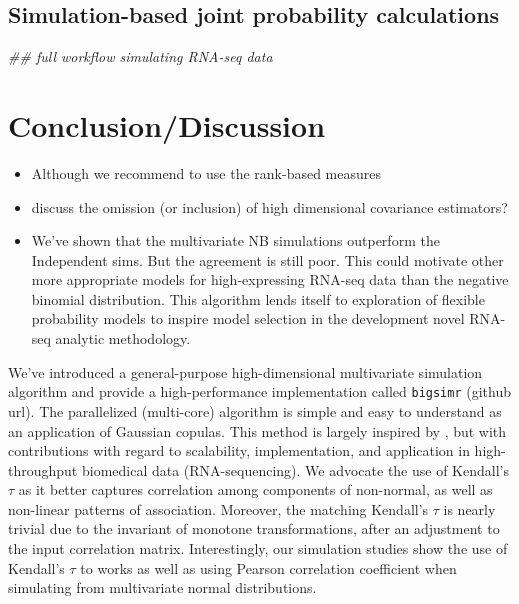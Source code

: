 \documentclass[
]{article}
\newenvironment{Shaded}{\begin{snugshade}}{\end{snugshade}}
\newcommand{\CommentTok}[1]{\textcolor[rgb]{0.56,0.35,0.01}{\textit{#1}}}
\providecommand{\tightlist}{%
  \setlength{\itemsep}{0pt}\setlength{\parskip}{0pt}}
\begin{document}
\hypertarget{simulation-based-joint-probability-calculations}{%
\subsection{Simulation-based joint probability calculations}\label{simulation-based-joint-probability-calculations}}

\begin{Shaded}
\begin{Highlighting}[]
\CommentTok{\#\# full workflow simulating RNA{-}seq data}
\end{Highlighting}
\end{Shaded}

\hypertarget{conclusiondiscussion}{%
\section{Conclusion/Discussion}\label{conclusiondiscussion}}

\begin{itemize}
\tightlist
\item
  Although we recommend to use the rank-based measures
\item
  discuss the omission (or inclusion) of high dimensional covariance estimators?
\item
  We've shown that the multivariate NB simulations outperform the Independent sims. But the agreement is still poor. This could motivate other more appropriate models for high-expressing RNA-seq data than the negative binomial distribution. This algorithm lends itself to exploration of flexible probability models to inspire model selection in the development novel RNA-seq analytic methodology.
\end{itemize}

We've introduced a general-purpose high-dimensional multivariate simulation algorithm and provide a high-performance implementation called \texttt{bigsimr} (github url). The parallelized (multi-core) algorithm is simple and easy to understand as an application of Gaussian copulas. This method is largely inspired by \citet{MB13}, but with contributions with regard to scalability, implementation, and application in high-throughput biomedical data (RNA-sequencing). We advocate the use of Kendall's \(\tau\) as it better captures correlation among components of non-normal, as well as non-linear patterns of association. Moreover, the matching Kendall's \(\tau\) is nearly trivial due to the invariant of monotone transformations, after an adjustment to the input correlation matrix. Interestingly, our simulation studies show the use of Kendall's \(\tau\) to works as well as using Pearson correlation coefficient when simulating from multivariate normal distributions.
\end{document}
